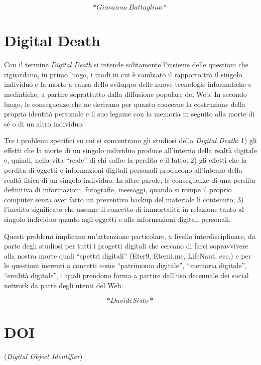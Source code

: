 \documentclass[
  b5paper,
  twoside,
  12pt,
  chapterprefix=false,
  bibliography=totocnumbered,
  parskip=false]{scrbook}
\begin{document}
\[*Giovanna~Battaglino*\]

\hypertarget{digital-death}{%
\chapter{Digital Death}\label{digital-death}}

Con il termine \emph{Digital Death} si intende solitamente l'insieme delle
questioni che riguardano, in primo luogo, i modi in cui è cambiato il
rapporto tra il singolo individuo e la morte a causa dello sviluppo
delle nuove tecnologie informatiche e mediatiche, a partire soprattutto
dalla diffusione popolare del Web. In secondo luogo, le conseguenze che
ne derivano per quanto concerne la costruzione della propria identità
personale e il suo legame con la memoria in seguito alla morte di sé o
di un altro individuo.

Tre i problemi specifici su cui si concentrano gli studiosi della
\emph{Digital Death}: 1) gli effetti che la morte di un singolo individuo
produce all'interno della realtà digitale e, quindi, nella vita \enquote{reale}
di chi soffre la perdita e il lutto; 2) gli effetti che la perdita di
oggetti e informazioni digitali personali producono all'interno della
realtà fisica di un singolo individuo. In altre parole, le conseguenze
di una perdita definitiva di informazioni, fotografie, messaggi, quando
si rompe il proprio computer senza aver fatto un preventivo backup del
materiale lì contenuto; 3) l'inedito significato che assume il concetto
di immortalità in relazione tanto al singolo individuo quanto agli
oggetti e alle informazioni digitali personali.

Questi problemi implicano un'attenzione particolare, a livello
interdisciplinare, da parte degli studiosi per tutti i progetti digitali
che cercano di farci sopravvivere alla nostra morte quali \enquote{spettri
digitali} (Eter9, Eterni.me, LifeNaut, ecc.) e per le questioni inerenti
a concetti come \enquote{patrimonio digitale}, \enquote{memoria digitale}, \enquote{eredità
digitale}, i quali prendono forma a partire dall'uso decennale dei
social network da parte degli utenti del Web.

\[*Davide Sisto*\]

\hypertarget{doi}{%
\chapter{DOI}\label{doi}}

(\emph{Digital Object Identifier})
\end{document}
